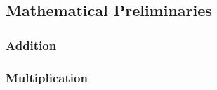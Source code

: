 \subsection{Mathematical Preliminaries}



\subsubsection{Addition}
\label{sec:addition}



\subsubsection{Multiplication}
\label{sec:multiplication}
